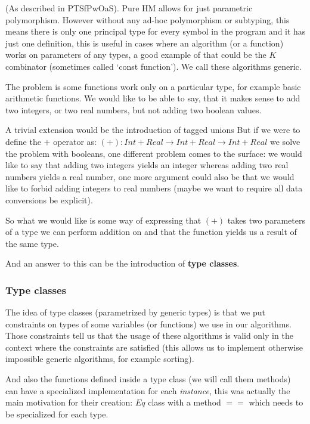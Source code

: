 (As described in PTSfPwOaS).
Pure HM allows for just parametric polymorphism. However without any ad-hoc polymorphism or subtyping, this means there is only one principal type for every symbol in the program and it has just one definition, this is useful in cases where an algorithm (or a function) works on parameters of any types, a good example of that could be the $K$ combinator (sometimes called `const function'). We call these algorithms generic.

The problem is some functions work only on a particular type, for example basic arithmetic functions. We would like to be able to say, that it makes sense to add two integers, or two real numbers, but not adding two boolean values.

A trivial extension would be the introduction of tagged unions %
But if we were to define the $+$ operator as: $(+) : Int + Real \rightarrow Int + Real \rightarrow Int + Real$ we solve the problem with booleans, one different problem comes to the surface: we would like to say that adding two integers yields an integer whereas adding two real numbers yields a real number, one more argument could also be that we would like to forbid adding integers to real numbers (maybe we want to require all data conversions be explicit).

So what we would like is some way of expressing that $(+)$ takes two parameters of a type we can perform addition on and that the function yields us a result of the same type.

And an answer to this can be the introduction of \textbf{type classes}.

\subsubsection{Type classes}

The idea of type classes (parametrized by generic types) is that we put constraints on types of some variables (or functions) we use in our algorithms. Those constraints tell us that the usage of these algorithms is valid only in the context where the constraints are satisfied (this allows us to implement otherwise impossible generic algorithms, for example sorting).

And also the functions defined inside a type class (we will call them methods) can have a specialized implementation for each \emph{instance}, this was actually the main motivation for their creation: $Eq$ class with a method $==$ which needs to be specialized for each type. %


